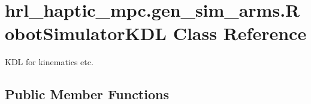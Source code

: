 \hypertarget{classhrl__haptic__mpc_1_1gen__sim__arms_1_1_robot_simulator_k_d_l}{\section{hrl\-\_\-haptic\-\_\-mpc.\-gen\-\_\-sim\-\_\-arms.\-Robot\-Simulator\-K\-D\-L \-Class \-Reference}
\label{classhrl__haptic__mpc_1_1gen__sim__arms_1_1_robot_simulator_k_d_l}
}


\-K\-D\-L for kinematics etc.  


\subsection*{\-Public \-Member \-Functions}
